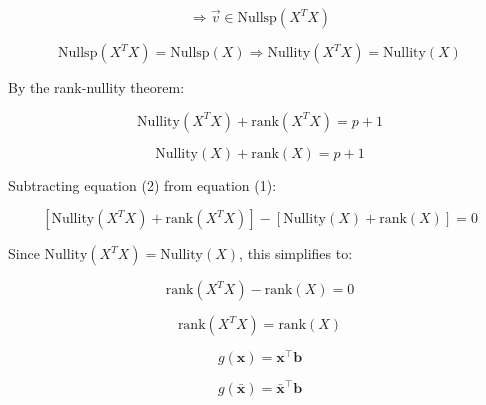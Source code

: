 \documentclass[12pt]{article}
\begin{document}
\begin{enumerate}
\[
\Rightarrow \vec{v} \in \text{Nullsp}(X^T X)
\]

\[
\text{Nullsp}(X^T X) = \text{Nullsp}(X) \Rightarrow \text{Nullity} (X^T X) = \text{Nullity} (X)
\]

By the rank-nullity theorem:

\begin{equation}
\text{Nullity} (X^T X) + \text{rank} (X^T X) = p+1
\end{equation}

\begin{equation}
\text{Nullity} (X) + \text{rank} (X) = p+1
\end{equation}

Subtracting equation (2) from equation (1):

\[
[\text{Nullity} (X^T X) + \text{rank} (X^T X)] - [\text{Nullity} (X) + \text{rank} (X)] = 0
\]

Since \(\text{Nullity} (X^T X) = \text{Nullity} (X)\), this simplifies to:

\[
\text{rank} (X^T X) - \text{rank} (X) = 0
\]

\[
\text{rank} (X^T X) = \text{rank} (X)
\]







\[
g(\mathbf{x}) = \mathbf{x}^\top \mathbf{b}
\]


\[
g(\bar{\mathbf{x}}) = \bar{\mathbf{x}}^\top \mathbf{b}
\]




\end{enumerate}
\end{document}
